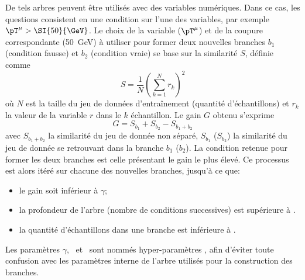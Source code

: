 \par
De tels arbres peuvent être utilisés avec des variables numériques.
Dans ce cas, les questions consistent en une condition sur l'une des variables, par exemple $\pT^{\mu} > \SI{50}{\GeV}$.
Le choix de la variable ($\pT^{\mu}$) et de la coupure correspondante (\SI{50}{\GeV}) à utiliser pour former deux nouvelles branches $b_1$ (condition fausse) et $b_2$ (condition vraie) se base sur la similarité $S$, définie comme
\begin{equation}
S = \frac{1}{N} \left(\sum_{k=1}^N r_k \right)^2
\end{equation}
où $N$ est la taille du jeu de données d'entraînement (quantité d'échantillons)
et $r_k$ la valeur de la variable $r$ dans le $k$ échantillon.
Le gain $G$ obtenu s'exprime
\begin{equation}
G = S_{b_1} + S_{b_2} - S_{b_1+b_2}
\end{equation}
avec
$S_{b_1+b_2}$ la similarité du jeu de donnée non séparé,
$S_{b_1}$ ($S_{b_2}$) la similarité du jeu de donnée se retrouvant dans la branche $b_1$ ($b_2$).
La condition retenue pour former les deux branches est celle présentant le gain le plus élevé.
Ce processus est alors itéré sur chacune des nouvelles branches, jusqu'à ce que:
\begin{itemize}
\item le gain soit inférieur à $\gamma$;
\item la profondeur de l'arbre (nombre de conditions successives) est supérieure à \MaxDepth.
\item la quantité d'échantillons dans une branche est inférieure à \MinChildWeight.
\end{itemize}
Les paramètres $\gamma$, \MaxDepth\ et \MinChildWeight\ sont nommés \og hyper-paramètres \fg,
afin d'éviter toute confusion avec les paramètres interne de l'arbre utilisés pour la construction des branches.
